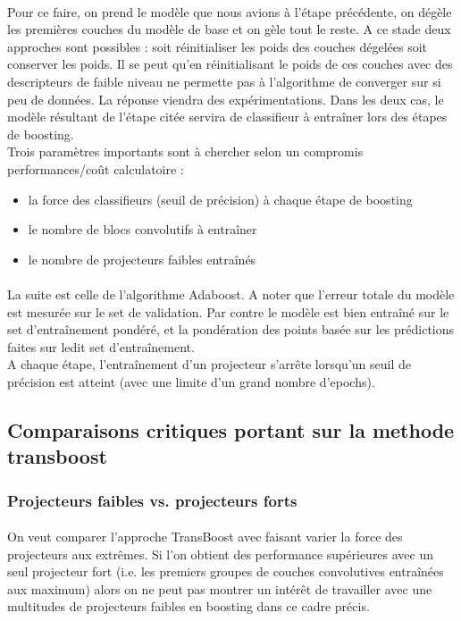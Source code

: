\documentclass[11 pt]{article}
\begin{document}
\paragraph{}Pour ce faire,  on prend le modèle que nous avions à l’étape précédente, on dégèle les premières couches du modèle de base et on gèle tout le reste. A ce stade deux approches sont possibles : soit réinitialiser les poids des couches dégelées soit conserver les poids. Il se peut qu’en réinitialisant le poids de ces couches avec des descripteurs de faible niveau ne permette pas à l’algorithme de converger sur si peu de données. La réponse viendra des expérimentations. Dans les deux cas, le modèle résultant de l’étape citée servira de classifieur à entraîner lors des étapes de boosting.\\
Trois paramètres importants sont à chercher selon un compromis performances/coût calculatoire :\\ \medskip
\begin{itemize}
  \item la force des classifieurs (seuil de précision) à chaque étape de boosting
  \item le nombre de blocs convolutifs à entraîner
  \item le nombre de projecteurs faibles entraînés
\end{itemize}

\paragraph{}La suite est celle de l’algorithme Adaboost. A noter que l’erreur totale du modèle est mesurée sur le set de validation. Par contre le modèle est bien entraîné sur le set d’entraînement pondéré, et la pondération des points basée sur les prédictions faites sur ledit set d’entraînement.\\
A chaque étape, l’entraînement d’un projecteur s’arrête lorsqu’un seuil de précision est atteint (avec une limite d’un grand nombre d’epochs).



\subsection{Comparaisons critiques portant sur la methode transboost}
\subsubsection{Projecteurs faibles vs. projecteurs forts}
\paragraph{}On veut comparer l’approche TransBoost avec faisant varier la force des projecteurs aux extrêmes. Si l’on obtient des performance supérieures avec un seul projecteur fort (i.e. les premiers groupes de couches convolutives entraînées aux maximum) alors on ne peut pas montrer un intérêt de travailler avec une multitudes de projecteurs faibles en boosting dans ce cadre précis.
\end{document}
